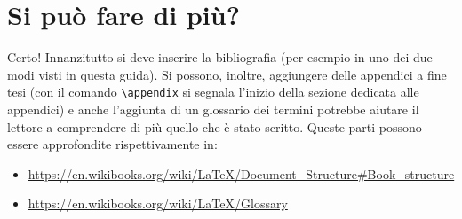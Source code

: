 \section{Si può fare di più?}

Certo! Innanzitutto si deve inserire la bibliografia (per esempio in uno dei due modi visti in questa guida). Si possono, inoltre, aggiungere delle appendici a fine tesi (con il comando \verb!\appendix! si segnala l'inizio della sezione dedicata alle appendici) e anche l'aggiunta di un glossario dei termini potrebbe aiutare il lettore a comprendere di più quello che è stato scritto. Queste parti possono essere approfondite rispettivamente in:
\begin{itemize}
  \item
    \url{https://en.wikibooks.org/wiki/LaTeX/Document_Structure#Book_structure}
  \item \url{https://en.wikibooks.org/wiki/LaTeX/Glossary}
\end{itemize}

